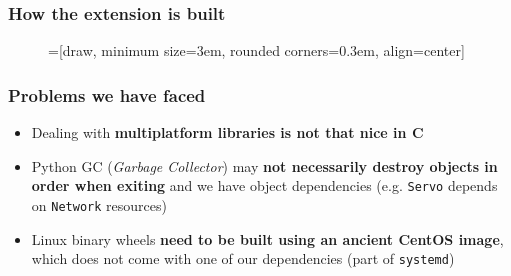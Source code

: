\documentclass[handout]{beamer}
\begin{document}
\begin{frame}
  \frametitle{How the extension is built}

  \begin{figure}
    \centering
    =[draw, minimum size=3em, rounded corners=0.3em, align=center]

  \end{figure}
\end{frame}

\begin{frame}
  \frametitle{Problems we have faced}

  \begin{itemize}
    \item<1-> Dealing with \textbf{multiplatform libraries is not that nice in
      C}
    \item<2-> Python GC (\textit{Garbage Collector}) may \textbf{not necessarily
      destroy objects in order when exiting} and we have object dependencies
      (e.g. \texttt{Servo} depends on \texttt{Network} resources)
    \item<3-> Linux binary wheels \textbf{need to be built using an ancient
      CentOS image}, which does not come with one of our dependencies (part of
      \texttt{systemd})
  \end{itemize}
\end{frame}
\end{document}
